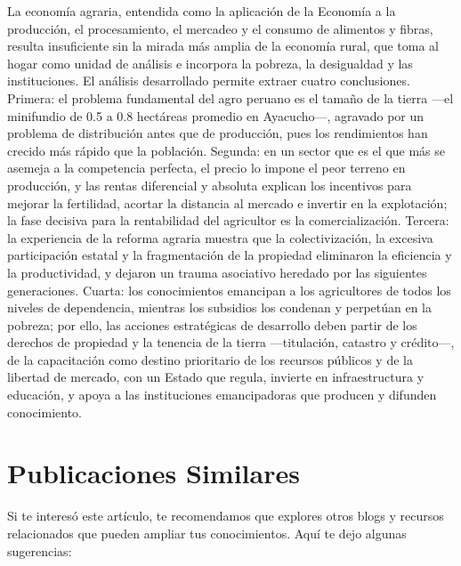 \documentclass[
  man,
  floatsintext,
  longtable,
  a4paper,
  nolmodern,
  notxfonts,
  notimes,
  12pt,
  colorlinks=true,linkcolor=blue,citecolor=blue,urlcolor=blue]{apa7}
\begin{document}
La economía agraria, entendida como la aplicación de la Economía a la
producción, el procesamiento, el mercadeo y el consumo de alimentos y
fibras, resulta insuficiente sin la mirada más amplia de la economía
rural, que toma al hogar como unidad de análisis e incorpora la pobreza,
la desigualdad y las instituciones. El análisis desarrollado permite
extraer cuatro conclusiones. Primera: el problema fundamental del agro
peruano es el tamaño de la tierra ---el minifundio de 0.5 a 0.8
hectáreas promedio en Ayacucho---, agravado por un problema de
distribución antes que de producción, pues los rendimientos han crecido
más rápido que la población. Segunda: en un sector que es el que más se
asemeja a la competencia perfecta, el precio lo impone el peor terreno
en producción, y las rentas diferencial y absoluta explican los
incentivos para mejorar la fertilidad, acortar la distancia al mercado e
invertir en la explotación; la fase decisiva para la rentabilidad del
agricultor es la comercialización. Tercera: la experiencia de la reforma
agraria muestra que la colectivización, la excesiva participación
estatal y la fragmentación de la propiedad eliminaron la eficiencia y la
productividad, y dejaron un trauma asociativo heredado por las
siguientes generaciones. Cuarta: los conocimientos emancipan a los
agricultores de todos los niveles de dependencia, mientras los subsidios
los condenan y perpetúan en la pobreza; por ello, las acciones
estratégicas de desarrollo deben partir de los derechos de propiedad y
la tenencia de la tierra ---titulación, catastro y crédito---, de la
capacitación como destino prioritario de los recursos públicos y de la
libertad de mercado, con un Estado que regula, invierte en
infraestructura y educación, y apoya a las instituciones emancipadoras
que producen y difunden conocimiento.

\section{Publicaciones Similares}\label{publicaciones-similares}

Si te interesó este artículo, te recomendamos que explores otros blogs y
recursos relacionados que pueden ampliar tus conocimientos. Aquí te dejo
algunas sugerencias:
\end{document}
